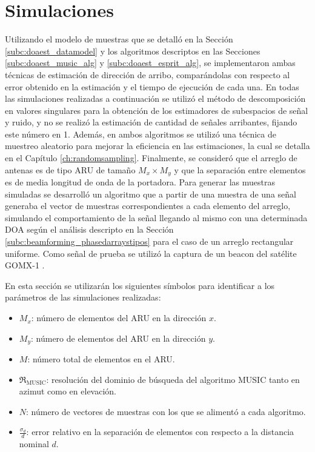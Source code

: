 \section{Simulaciones}\label{subc:doaest_comparaciones}
Utilizando el modelo de muestras que se detalló en la Sección \ref{subc:doaest_datamodel} y los algoritmos descriptos en las Secciones \ref{subc:doaest_music_alg} y \ref{subc:doaest_esprit_alg}, se implementaron ambas técnicas de estimación de dirección de arribo, comparándolas con respecto al error obtenido en la estimación y el tiempo de ejecución de cada una.
En todas las simulaciones realizadas a continuación se utilizó el método de descomposición en valores singulares para la obtención de los estimadores de subespacios de señal y ruido, y no se realizó la estimación de cantidad de señales arribantes, fijando este número en 1. Además, en ambos algoritmos se utilizó una técnica de muestreo aleatorio para mejorar la eficiencia en las estimaciones, la cual se detalla en el Capítulo \ref{ch:randomsampling}. Finalmente, se consideró que el arreglo de antenas es de tipo ARU de tamaño $M_x \times M_y$ y que la separación entre elementos es de media longitud de onda de la portadora.
Para generar las muestras simuladas se desarrolló un algoritmo que a partir de una muestra de una señal generaba el vector de muestras correspondientes a cada elemento del arreglo, simulando el comportamiento de la señal llegando al mismo con una determinada DOA según el análisis descripto en la Sección \ref{subc:beamforming_phasedarraystipos} para el caso de un arreglo rectangular uniforme. Como señal de prueba se utilizó la captura de un beacon del satélite GOMX-1 \cite{bib:gomx-1}.

En esta sección se utilizarán los siguientes símbolos para identificar a los parámetros de las simulaciones realizadas:
\begin{itemize}
    \item $M_x$: número de elementos del ARU en la dirección $x$.
    \item $M_y$: número de elementos del ARU en la dirección $y$.
    \item $M$: número total de elementos en el ARU.
    \item $\mathfrak{R}_{\textrm{MUSIC}}$: resolución del dominio de búsqueda del algoritmo MUSIC tanto en azimut como en elevación.
    \item $N$: número de vectores de muestras con los que se alimentó a cada algoritmo.
    \item $\frac{\sigma_d}{d}$: error relativo en la separación de elementos con respecto a la distancia nominal $d$.
\end{itemize}

